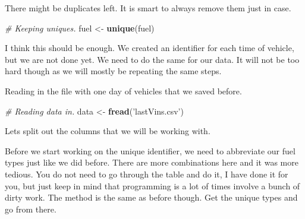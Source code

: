 \documentclass[]{book}
\newenvironment{Shaded}{\begin{snugshade}}{\end{snugshade}}
\newcommand{\CommentTok}[1]{\textcolor[rgb]{0.56,0.35,0.01}{\textit{#1}}}
\newcommand{\KeywordTok}[1]{\textcolor[rgb]{0.13,0.29,0.53}{\textbf{#1}}}
\newcommand{\NormalTok}[1]{#1}
\newcommand{\OperatorTok}[1]{\textcolor[rgb]{0.81,0.36,0.00}{\textbf{#1}}}
\newcommand{\StringTok}[1]{\textcolor[rgb]{0.31,0.60,0.02}{#1}}
\begin{document}
There might be duplicates left. It is smart to always remove them just in case.

\begin{Shaded}
\begin{Highlighting}[]
\CommentTok{# Keeping uniques.}
\NormalTok{fuel <-}\StringTok{ }\KeywordTok{unique}\NormalTok{(fuel)}
\end{Highlighting}
\end{Shaded}

I think this should be enough. We created an identifier for each time of vehicle, but we are not done yet. We need to do the same for our data. It will not be too hard though as we will mostly be repeating the same steps.

Reading in the file with one day of vehicles that we saved before.

\begin{Shaded}
\begin{Highlighting}[]
\CommentTok{# Reading data in.}
\NormalTok{data <-}\StringTok{ }\KeywordTok{fread}\NormalTok{(}\StringTok{'lastVins.csv'}\NormalTok{)}
\end{Highlighting}
\end{Shaded}

Lets split out the columns that we will be working with.

\begin{Shaded}
\end{Shaded}

Before we start working on the unique identifier, we need to abbreviate our fuel types just like we did before. There are more combinations here and it was more tedious. You do not need to go through the table and do it, I have done it for you, but just keep in mind that programming is a lot of times involve a bunch of dirty work. The method is the same as before though. Get the unique types and go from there.
\end{document}
